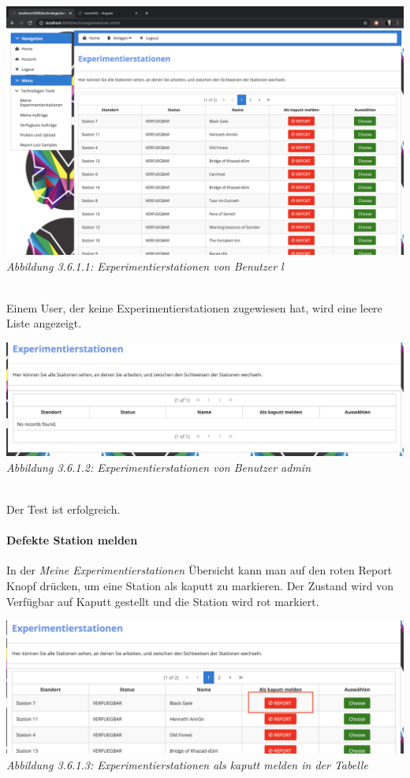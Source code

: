 \documentclass[enabledeprecatedfontcommands,fontsize=12pt,paper=a4,twoside]{scrartcl}
\begin{document}
 \hypertarget{sc3.6.1.1}{
\includegraphics[width=1\textwidth]{Screenshots/3611.png}
\textit{Abbildung 3.6.1.1: Experimentierstationen von Benutzer l}
} \\

Einem User, der keine Experimentierstationen zugewiesen hat, wird eine leere Liste angezeigt.

 \hypertarget{sc3.6.1.2}{
\includegraphics[width=1\textwidth]{Screenshots/3612.png}
\textit{Abbildung 3.6.1.2: Experimentierstationen von Benutzer admin}
} \\

Der Test ist erfolgreich.

%
\paragraph{Defekte Station melden}

In der \textit{Meine Experimentierstationen} Übersicht kann man auf den roten Report Knopf drücken, um eine Station als kaputt zu markieren. Der Zustand wird von Verfügbar auf Kaputt gestellt und die Station wird rot markiert.

 \hypertarget{sc3.6.1.3}{
\includegraphics[width=1\textwidth]{Screenshots/3613.png}
\textit{Abbildung 3.6.1.3: Experimentierstationen als kaputt melden in der Tabelle}
} \\
\end{document}
